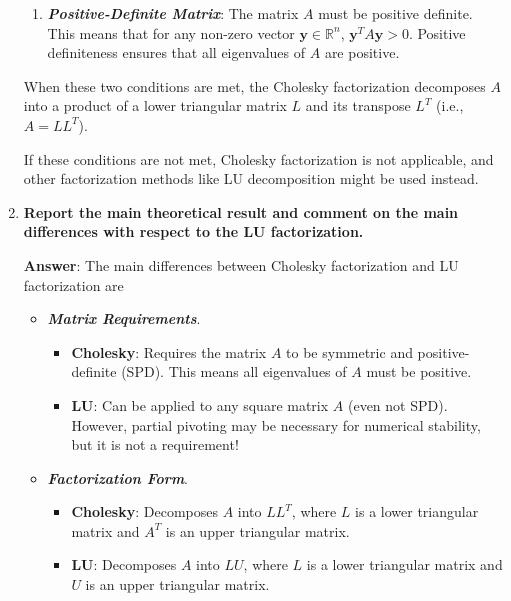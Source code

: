 \begin{enumerate}[label=\textcolor{Green3}{\textbf{\arabic*.}}]
\begin{enumerate}
        \item \textbf{\emph{Positive-Definite Matrix}}: The matrix $A$ must be positive definite. This means that for any non-zero vector $\mathbf{y} \in \mathbb{R}^n$, $\mathbf{y}^T A \mathbf{y} > 0$. Positive definiteness ensures that all eigenvalues of $A$ are positive.
    \end{enumerate}
    When these two conditions are met, the Cholesky factorization decomposes $A$ into a product of a lower triangular matrix $L$ and its transpose $L^T$ (i.e., $A = LL^T$).

    If these conditions are not met, Cholesky factorization is not applicable, and other factorization methods like LU decomposition might be used instead.


    \newpage

    \item \textcolor{Green3}{\textbf{%
        Report the main theoretical result and comment on the main diﬀerences with respect to the LU factorization.%
    }}

    \textbf{Answer}: The main differences between Cholesky factorization and LU factorization are
    \begin{itemize}
        \item \textbf{\emph{Matrix Requirements}}.
        \begin{itemize}
            \item \textbf{Cholesky}: Requires the matrix $A$ to be symmetric and positive-definite (SPD). This means all eigenvalues of $A$ must be positive.
            \item \textbf{LU}: Can be applied to any square matrix $A$ (even not SPD). However, partial pivoting may be necessary for numerical stability, but it is not a requirement!
        \end{itemize}

        \item \textbf{\emph{Factorization Form}}.
        \begin{itemize}
            \item \textbf{Cholesky}: Decomposes $A$ into $LL^{T}$, where $L$ is a lower triangular matrix and $A^{T}$ is an upper triangular matrix.
            \item \textbf{LU}: Decomposes $A$ into $LU$, where $L$ is a lower triangular matrix and $U$ is an upper triangular matrix.
        \end{itemize}


\end{itemize}
\end{enumerate}
